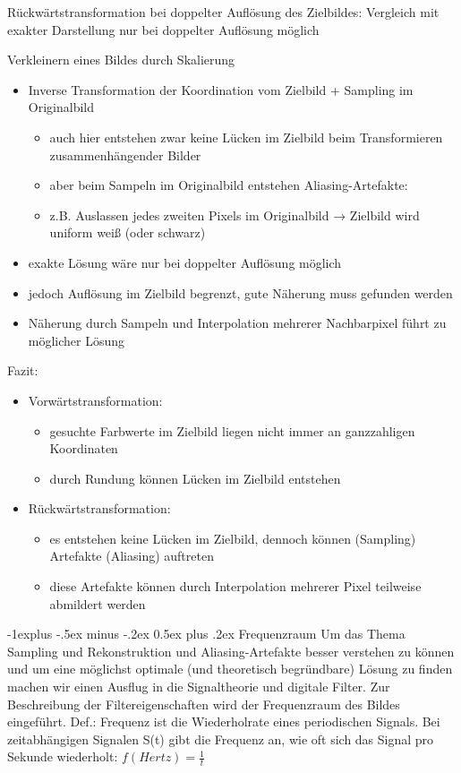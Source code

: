 \documentclass[10pt,landscape]{article}
\makeatletter
\renewcommand{\subsection}{\@startsection{subsection}{2}{0mm}%
                                {-1explus -.5ex minus -.2ex}%
                                {0.5ex plus .2ex}%
                                {\normalfont\normalsize\bfseries}}
\makeatother
\begin{document}
\begin{multicols}{3}

Rückwärtstransformation bei doppelter Auflösung des Zielbildes: Vergleich mit exakter Darstellung nur bei doppelter Auflösung möglich

Verkleinern eines Bildes durch Skalierung
\begin{itemize}
\item Inverse Transformation der Koordination vom Zielbild + Sampling im Originalbild
\begin{itemize}
  \item auch hier entstehen zwar keine Lücken im Zielbild beim Transformieren zusammenhängender Bilder
  \item aber beim Sampeln im Originalbild entstehen Aliasing-Artefakte:
  \item z.B. Auslassen jedes zweiten Pixels im Originalbild → Zielbild wird uniform weiß (oder schwarz)
\end{itemize}
\item exakte Lösung wäre nur bei doppelter Auflösung möglich
\item jedoch Auflösung im Zielbild begrenzt, gute Näherung muss gefunden werden
\item Näherung durch Sampeln und Interpolation mehrerer Nachbarpixel führt zu möglicher Lösung
\end{itemize}


Fazit:
\begin{itemize}
  \item Vorwärtstransformation:
        \begin{itemize}
          \item gesuchte Farbwerte im Zielbild liegen nicht immer an ganzzahligen Koordinaten
          \item durch Rundung können Lücken im Zielbild entstehen
        \end{itemize}
  \item Rückwärtstransformation:
        \begin{itemize}
          \item es entstehen keine Lücken im Zielbild, dennoch können (Sampling) Artefakte (Aliasing) auftreten
          \item diese Artefakte können durch Interpolation mehrerer Pixel teilweise abmildert werden
        \end{itemize}
\end{itemize}


\subsection{Frequenzraum}
Um das Thema Sampling und Rekonstruktion und Aliasing-Artefakte besser verstehen zu können und um eine möglichst optimale (und theoretisch begründbare) Lösung zu finden machen wir einen Ausflug in die Signaltheorie und digitale Filter.
Zur Beschreibung der Filtereigenschaften wird der Frequenzraum des Bildes eingeführt.
Def.: Frequenz ist die Wiederholrate eines periodischen Signals. Bei zeitabhängigen Signalen S(t) gibt die Frequenz an, wie oft sich das Signal pro Sekunde wiederholt: $f(Hertz)=\frac{1}{t}$


\end{multicols}
\end{document}
